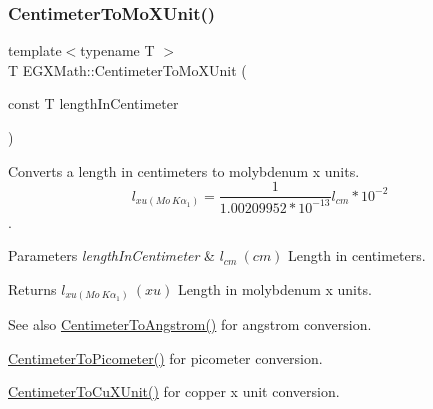 \subsubsection{\texorpdfstring{Centimeter\+To\+Mo\+X\+Unit()}{CentimeterToMoXUnit()}}
{\footnotesize\ttfamily template$<$typename T $>$ \\
T E\+G\+X\+Math\+::\+Centimeter\+To\+Mo\+X\+Unit (\begin{DoxyParamCaption}\item[{const T}]{length\+In\+Centimeter }\end{DoxyParamCaption})}



Converts a length in centimeters to molybdenum x units. \[ l_{xu(Mo\ K\alpha_1)}=\frac{1}{1.00209952*10^{-13}} l_{cm} * 10^{-2}\]. 


\begin{DoxyParams}{Parameters}
{\em length\+In\+Centimeter} & $ l_{cm}\ (cm)$ Length in centimeters. \\
\hline
\end{DoxyParams}
\begin{DoxyReturn}{Returns}
$ l_{xu(Mo\ K\alpha_1)}\ (xu)$ Length in molybdenum x units. 
\end{DoxyReturn}
\begin{DoxySeeAlso}{See also}
\mbox{\hyperlink{group___e_g_x_math-_conversions-_length_conversions-_s_i-_centimeter-_non-_s_i_gacabf2b01cd8676ffb5ec8c70ecd621b6}{Centimeter\+To\+Angstrom()}} for angstrom conversion. 

\mbox{\hyperlink{group___e_g_x_math-_conversions-_length_conversions-_s_i-_centimeter-_s_i_ga7e2851b0052f1b135a84aa860495e4ba}{Centimeter\+To\+Picometer()}} for picometer conversion. 

\mbox{\hyperlink{group___e_g_x_math-_conversions-_length_conversions-_s_i-_centimeter-_non-_s_i_ga98d44269c80a1c5ab7c38d27aba39517}{Centimeter\+To\+Cu\+X\+Unit()}} for copper x unit conversion. 
\end{DoxySeeAlso}
